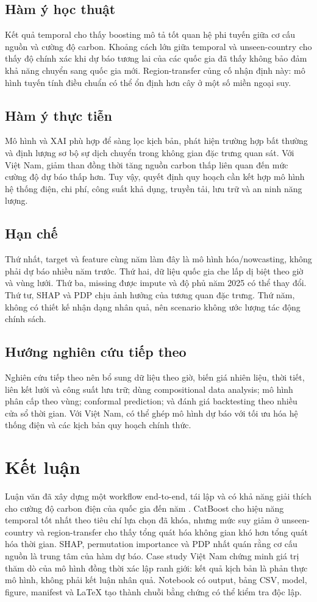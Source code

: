 \documentclass[12pt,a4paper,oneside]{report}
\begin{document}
\section{Hàm ý học thuật}
Kết quả temporal cho thấy boosting mô tả tốt quan hệ phi tuyến giữa cơ cấu nguồn và cường độ carbon. Khoảng cách lớn giữa temporal và unseen-country cho thấy độ chính xác khi dự báo tương lai của các quốc gia đã thấy không bảo đảm khả năng chuyển sang quốc gia mới. Region-transfer củng cố nhận định này: mô hình tuyến tính điều chuẩn có thể ổn định hơn cây ở một số miền ngoại suy.

\section{Hàm ý thực tiễn}
Mô hình và XAI phù hợp để sàng lọc kịch bản, phát hiện trường hợp bất thường và định lượng sơ bộ sự dịch chuyển trong không gian đặc trưng quan sát. Với Việt Nam, giảm than đồng thời tăng nguồn carbon thấp liên quan đến mức cường độ dự báo thấp hơn. Tuy vậy, quyết định quy hoạch cần kết hợp mô hình hệ thống điện, chi phí, công suất khả dụng, truyền tải, lưu trữ và an ninh năng lượng.

\section{Hạn chế}
Thứ nhất, target và feature cùng năm làm đây là mô hình hóa/nowcasting, không phải dự báo nhiều năm trước. Thứ hai, dữ liệu quốc gia che lấp dị biệt theo giờ và vùng lưới. Thứ ba, missing được impute và độ phủ năm 2025 có thể thay đổi. Thứ tư, SHAP và PDP chịu ảnh hưởng của tương quan đặc trưng. Thứ năm, không có thiết kế nhận dạng nhân quả, nên scenario không ước lượng tác động chính sách.

\section{Hướng nghiên cứu tiếp theo}
Nghiên cứu tiếp theo nên bổ sung dữ liệu theo giờ, biến giá nhiên liệu, thời tiết, liên kết lưới và công suất lưu trữ; dùng compositional data analysis; mô hình phân cấp theo vùng; conformal prediction; và đánh giá backtesting theo nhiều cửa sổ thời gian. Với Việt Nam, có thể ghép mô hình dự báo với tối ưu hóa hệ thống điện và các kịch bản quy hoạch chính thức.

\chapter{Kết luận}
Luận văn đã xây dựng một workflow end-to-end, tái lập và có khả năng giải thích cho cường độ carbon điện của \PanelCountries{} quốc gia đến năm \PanelEndYear. CatBoost cho hiệu năng temporal tốt nhất theo tiêu chí lựa chọn đã khóa, nhưng mức suy giảm ở unseen-country và region-transfer cho thấy tổng quát hóa không gian khó hơn tổng quát hóa thời gian. SHAP, permutation importance và PDP nhất quán rằng cơ cấu nguồn là trung tâm của hàm dự báo. Case study Việt Nam chứng minh giá trị thăm dò của mô hình đồng thời xác lập ranh giới: kết quả kịch bản là phản thực mô hình, không phải kết luận nhân quả. Notebook có output, bảng CSV, model, figure, manifest và LaTeX tạo thành chuỗi bằng chứng có thể kiểm tra độc lập.
\end{document}
